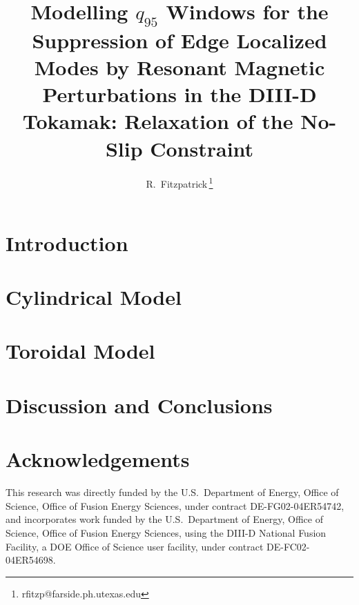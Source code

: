 \documentclass[12pt,prb,aps]{revtex4-1}
\begin{document}
\title {Modelling $q_{95}$ Windows for the Suppression of Edge Localized Modes by Resonant Magnetic Perturbations in the DIII-D Tokamak: Relaxation of the No-Slip
Constraint}

\author{R.~Fitzpatrick\,\footnote{rfitzp@farside.ph.utexas.edu}}


 
\maketitle

\section{Introduction}

\section{Cylindrical Model}

\section{Toroidal Model}

\section{Discussion and Conclusions}

\section*{Acknowledgements}
This research was directly funded by the U.S.\ Department of Energy, Office of Science, Office of Fusion Energy Sciences,  under contract DE-FG02-04ER54742, and
incorporates work funded by the U.S.\ Department of Energy, Office of Science, Office of Fusion Energy Sciences, using the DIII-D National Fusion Facility, a DOE Office of Science user facility, under contract DE-FC02-04ER54698.  
\end{document}
